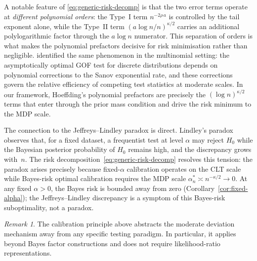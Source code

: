 \documentclass[11pt]{article}
\newcommand{\rhotail}{\rho}  %
\newcommand{\1}{\mathbf{1}}
\theoremstyle{plain}
\theoremstyle{definition}
\theoremstyle{remark}
\newtheorem{remark}[theorem]{Remark}
\begin{document}
A notable feature of \eqref{eq:generic-risk-decomp} is that the two error terms operate at \emph{different polynomial orders}: the Type~I term $n^{-2\rhotail\,a}$ is controlled by the tail exponent alone, while the Type~II term $(a\log n/n)^{\kappa/2}$ carries an additional polylogarithmic factor through the $a\log n$ numerator.
This separation of orders is what makes the polynomial prefactors decisive for risk minimisation rather than negligible.
\citet{Hoeffding1965} identified the same phenomenon in the multinomial setting: the asymptotically optimal GOF test for discrete distributions depends on polynomial corrections to the Sanov exponential rate, and these corrections govern the relative efficiency of competing test statistics at moderate scales.
In our framework, Hoeffding's polynomial prefactors are precisely the $(\log n)^{\kappa/2}$ terms that enter through the prior mass condition and drive the risk minimum to the MDP scale.

The connection to the Jeffreys--Lindley paradox \citep{JeffreysBook, Lindley1957} is direct.
Lindley's paradox observes that, for a fixed dataset, a frequentist test at level $\alpha$ may reject $H_0$ while the Bayesian posterior probability of $H_0$ remains high, and the discrepancy grows with~$n$.
The risk decomposition~\eqref{eq:generic-risk-decomp} resolves this tension: the paradox arises precisely because fixed-$\alpha$ calibration operates on the CLT scale while Bayes-risk optimal calibration requires the MDP scale $\alpha_n^{*}\asymp n^{-\kappa/2}\to 0$.
At any fixed $\alpha>0$, the Bayes risk is bounded away from zero (Corollary~\ref{cor:fixed-alpha}); the Jeffreys--Lindley discrepancy is a symptom of this Bayes-risk suboptimality, not a paradox.

\begin{remark}
The calibration principle above abstracts the moderate deviation mechanism away from any specific testing paradigm.
In particular, it applies beyond Bayes factor constructions and does not require likelihood-ratio representations.
\end{remark}
\end{document}
